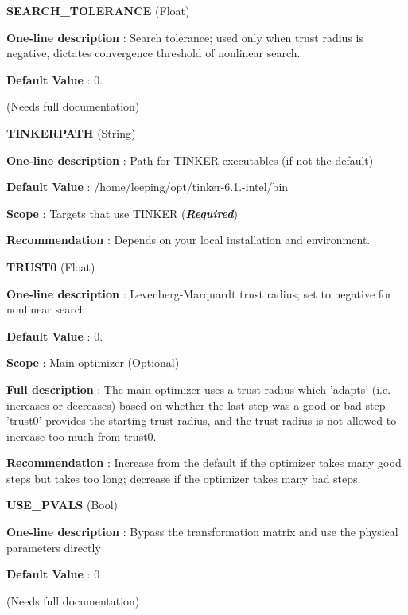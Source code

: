 \begin{DoxyItemize}
\item {\bfseries  \-S\-E\-A\-R\-C\-H\-\_\-\-T\-O\-L\-E\-R\-A\-N\-C\-E } (\-Float) \par
{\bfseries  \-One-\/line description }\-: \-Search tolerance; used only when trust radius is negative, dictates convergence threshold of nonlinear search. \par
{\bfseries  \-Default \-Value }\-: 0. \par
(\-Needs full documentation)\end{DoxyItemize}
\begin{DoxyItemize}
\item {\bfseries  \-T\-I\-N\-K\-E\-R\-P\-A\-T\-H } (\-String) \par
{\bfseries  \-One-\/line description }\-: \-Path for \-T\-I\-N\-K\-E\-R executables (if not the default) \par
{\bfseries  \-Default \-Value }\-: /home/leeping/opt/tinker-\/6.1.-\/intel/bin \par
{\bfseries  \-Scope }\-: \-Targets that use \-T\-I\-N\-K\-E\-R ({\bfseries {\itshape \-Required\/}}) \par
{\bfseries  \-Recommendation }\-: \-Depends on your local installation and environment.\end{DoxyItemize}
\begin{DoxyItemize}
\item {\bfseries  \-T\-R\-U\-S\-T0 } (\-Float) \par
{\bfseries  \-One-\/line description }\-: \-Levenberg-\/\-Marquardt trust radius; set to negative for nonlinear search \par
{\bfseries  \-Default \-Value }\-: 0. \par
{\bfseries  \-Scope }\-: \-Main optimizer (\-Optional) \par
{\bfseries  \-Full description }\-: \-The main optimizer uses a trust radius which 'adapts' (i.\-e. increases or decreases) based on whether the last step was a good or bad step. 'trust0' provides the starting trust radius, and the trust radius is not allowed to increase too much from trust0. \par
{\bfseries  \-Recommendation }\-: \-Increase from the default if the optimizer takes many good steps but takes too long; decrease if the optimizer takes many bad steps.\end{DoxyItemize}
\begin{DoxyItemize}
\item {\bfseries  \-U\-S\-E\-\_\-\-P\-V\-A\-L\-S } (\-Bool) \par
{\bfseries  \-One-\/line description }\-: \-Bypass the transformation matrix and use the physical parameters directly \par
{\bfseries  \-Default \-Value }\-: 0 \par
(\-Needs full documentation)\end{DoxyItemize}
